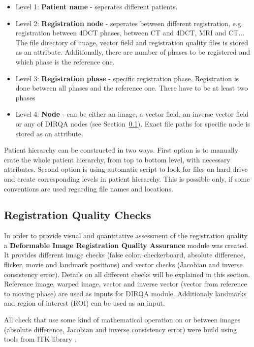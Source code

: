 \documentclass[type=dr, dr=rernat, accentcolor=tud7b,colorbacktitle, bigchapter, openright, twoside, 12pt ]{tudthesis}
\begin{document}
\begin{itemize}
	\item Level 1: \textbf{Patient name} - seperates different patients.
	\item Level 2: \textbf{Registration node} - seperates between different registration, e.g. registration between 4DCT phases, between CT and 4DCT, MRI and CT... 
	\subitem The file directory of image, vector field and registration quality files is stored as an attribute. Additionally, there are number of phases to be registered and which phase is the reference one.
	\item Level 3: \textbf{Registration phase} - specific registration phase. Registration is done between all phases and the reference one. There have to be at least two phases
	\item Level 4: \textbf{Node} - can be either an image, a vector field, an inverse vector field or any of DIRQA nodes (see Section~\ref{DIRQA}).
	\subitem Exact file paths for specific node is stored as an attribute.
\end{itemize}

Patient hierarchy can be constructed in two ways. First option is to manually crate the whole patient hierarchy, from top to bottom level, with necessary attributes. Second option is using automatic script to look for files on hard drive and create corresponding levels in patient hierarchy. This
is possible only, if some conventions are used regarding file names and locations.

\subsection{Registration Quality Checks}
\label{DIRQA}

In order to provide visual and quantitative assessment of the registration quality a \textbf{Deformable Image Registration Quality Assurance} module was created. It provides different image checks (false color, checkerboard, absolute difference, flicker, movie and landmark positions) and vector checks (Jacobian and inverse consistency error). Details on all different checks will be explained in this section. Reference image, warped image, vector and inverse vector (vector from reference to moving phase) are used as inputs for DIRQA module. Additionaly landmarks and region of interest (ROI) can be used as an input.

All check that use some kind of mathematical operation on or between images (absolute difference, Jacobian and inverse consistency error) were build using tools from ITK library \cite{Yoo2002}.
\end{document}
